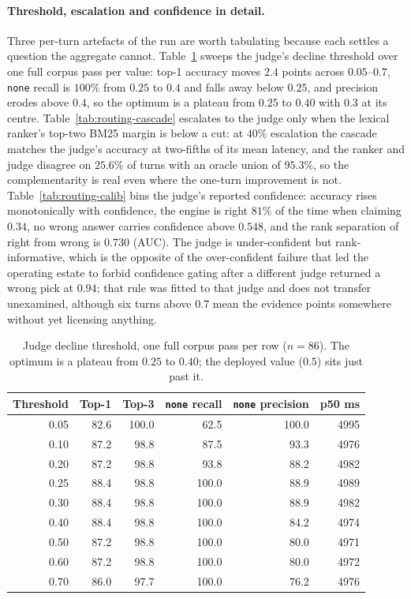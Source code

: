 \paragraph{Threshold, escalation and confidence in detail.} Three per-turn artefacts of the run are worth tabulating because each settles a question the aggregate cannot. Table~\ref{tab:routing-sweep} sweeps the judge's decline threshold over one full corpus pass per value: top-1 accuracy moves $2.4$ points across $0.05$--$0.7$, \texttt{none} recall is $100\%$ from $0.25$ to $0.4$ and falls away below $0.25$, and precision erodes above $0.4$, so the optimum is a plateau from $0.25$ to $0.40$ with $0.3$ at its centre. Table~\ref{tab:routing-cascade} escalates to the judge only when the lexical ranker's top-two BM25 margin is below a cut: at $40\%$ escalation the cascade matches the judge's accuracy at two-fifths of its mean latency, and the ranker and judge disagree on $25.6\%$ of turns with an oracle union of $95.3\%$, so the complementarity is real even where the one-turn improvement is not. Table~\ref{tab:routing-calib} bins the judge's reported confidence: accuracy rises monotonically with confidence, the engine is right $81\%$ of the time when claiming $0.34$, no wrong answer carries confidence above $0.548$, and the rank separation of right from wrong is $0.730$ (AUC). The judge is under-confident but rank-informative, which is the opposite of the over-confident failure that led the operating estate to forbid confidence gating after a different judge returned a wrong pick at $0.94$; that rule was fitted to that judge and does not transfer unexamined, although six turns above $0.7$ mean the evidence points somewhere without yet licensing anything.

\begin{table}[t]\centering\small
\caption{Judge decline threshold, one full corpus pass per row ($n=86$). The optimum is a plateau from
$0.25$ to $0.40$; the deployed value ($0.5$) sits just past it.}
\label{tab:routing-sweep}
\begin{tabular}{rrrrrr}
\toprule
Threshold & Top-1 & Top-3 & \texttt{none} recall & \texttt{none} precision & p50 ms \\
\midrule
0.05 & 82.6 & 100.0 & 62.5  & 100.0 & 4995 \\
0.10 & 87.2 & 98.8  & 87.5  & 93.3  & 4976 \\
0.20 & 87.2 & 98.8  & 93.8  & 88.2  & 4982 \\
0.25 & 88.4 & 98.8  & 100.0 & 88.9  & 4989 \\
0.30 & 88.4 & 98.8  & 100.0 & 88.9  & 4982 \\
0.40 & 88.4 & 98.8  & 100.0 & 84.2  & 4974 \\
0.50 & 87.2 & 98.8  & 100.0 & 80.0  & 4971 \\
0.60 & 87.2 & 98.8  & 100.0 & 80.0  & 4972 \\
0.70 & 86.0 & 97.7  & 100.0 & 76.2  & 4976 \\
\bottomrule
\end{tabular}
\end{table}

